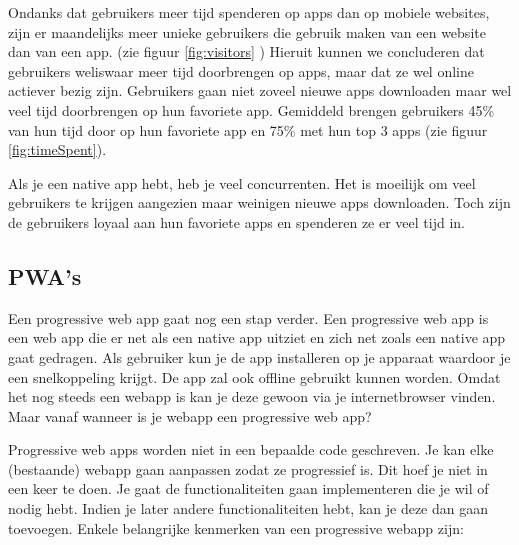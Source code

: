 Ondanks dat gebruikers meer tijd spenderen op apps dan op mobiele websites, zijn er maandelijks meer unieke gebruikers die gebruik maken van een website dan van een app. (zie figuur \ref{fig:visitors} ) Hieruit kunnen we concluderen dat gebruikers weliswaar meer tijd doorbrengen op apps, maar dat ze wel online actiever bezig zijn. Gebruikers gaan niet zoveel nieuwe apps downloaden maar wel veel tijd doorbrengen op hun favoriete app. Gemiddeld brengen gebruikers 45\% van hun tijd door op hun favoriete app en 75\% met hun top 3 apps (zie figuur \ref{fig:timeSpent}).

Als je een native app hebt, heb je veel concurrenten. Het is moeilijk om veel gebruikers te krijgen aangezien maar weinigen nieuwe apps downloaden. Toch zijn de gebruikers loyaal aan hun favoriete apps en spenderen ze er veel tijd in.


\subsection{PWA's}
Een progressive web app gaat nog een stap verder. Een progressive web app is een web app die er net als een native app uitziet en zich net zoals een native app gaat gedragen. Als gebruiker kun je de app installeren op je apparaat waardoor je een snelkoppeling krijgt. De app zal ook offline gebruikt kunnen worden. Omdat het nog steeds een webapp is kan je deze gewoon via je internetbrowser vinden. Maar vanaf wanneer is je webapp een progressive web app? 

Progressive web apps worden niet in een bepaalde code geschreven. Je kan elke (bestaande) webapp gaan aanpassen zodat ze progressief is. Dit hoef je niet in een keer te doen. Je gaat de functionaliteiten gaan implementeren die je wil of nodig hebt. Indien je later andere functionaliteiten hebt, kan je deze dan gaan toevoegen.
Enkele belangrijke kenmerken van een progressive webapp zijn:

